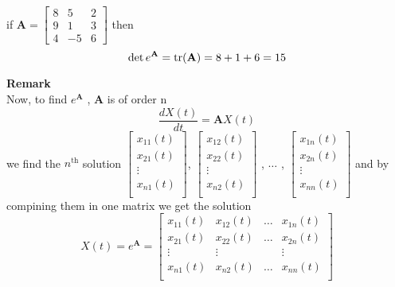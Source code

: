\documentclass[]{article}
\begin{document}
\begin{example}
    if
    \(
    \mathbf{A} = \begin{bmatrix}
        8 & 5  & 2 \\
        9 & 1  & 3 \\
        4 & -5 & 6
    \end{bmatrix}
    \)
    then
    \[
        \det e^{\mathbf{A}} = \trace(\mathbf{A}) = 8+1+6 = 15
    \]
\end{example}
\textbf{Remark}\\
Now, to find $e^{\mathbf{A}}$ , $\mathbf{A}$ is of order n
\[
    \frac{dX(t)}{dt}   = \mathbf{A}X(t)
\]
we find the $n^{\text{th}}$ solution
$
    \begin{bmatrix}
        x_{11}(t) \\
        x_{21}(t) \\
        \vdots    \\
        x_{n1}(t) \\
    \end{bmatrix}
$,
$
    \begin{bmatrix}
        x_{12}(t) \\
        x_{22}(t) \\
        \vdots    \\
        x_{n2}(t) \\
    \end{bmatrix}
$
,
$\dots$
,
$
    \begin{bmatrix}
        x_{1n}(t) \\
        x_{2n}(t) \\
        \vdots    \\
        x_{nn}(t) \\
    \end{bmatrix}
$
and by compining them in one matrix we get the solution
\[
    X(t) = e^{\mathbf{A}} = \begin{bmatrix}
        x_{11}(t) & x_{12}(t) & \dots & x_{1n}(t) \\
        x_{21}(t) & x_{22}(t) & \dots & x_{2n}(t) \\
        \vdots    & \vdots    &       & \vdots    \\
        x_{n1}(t) & x_{n2}(t) & \dots & x_{nn}(t) \\
    \end{bmatrix}
\]
\end{document}
